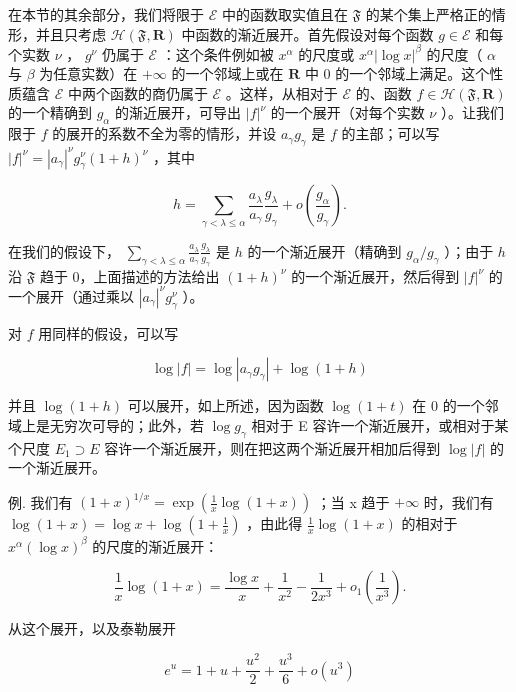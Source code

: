 在本节的其余部分，我们将限于 \(\mathcal{E}\) 中的函数取实值且在 \(\mathfrak{F}\) 的某个集上严格正的情形，并且只考虑 \(\mathcal{H}(\mathfrak{F},\mathbf{R})\) 中函数的渐近展开。首先假设对每个函数 \(g\in \mathcal{E}\) 和每个实数 \(\nu\) ， \(g^{\nu}\) 仍属于 \(\mathcal{E}\) ：这个条件例如被 \(x^{\alpha}\) 的尺度或 \(x^{\alpha}|\log x|^{\beta}\) 的尺度（ \(\alpha\) 与 \(\beta\) 为任意实数）在 \(+\infty\) 的一个邻域上或在 \(\mathbf{R}\) 中 0 的一个邻域上满足。这个性质蕴含 \(\mathcal{E}\) 中两个函数的商仍属于 \(\mathcal{E}\) 。这样，从相对于 \(\mathcal{E}\) 的、函数 \(f\in \mathcal{H}(\mathfrak{F},\mathbf{R})\) 的一个精确到 \(g_{\alpha}\) 的渐近展开，可导出 \(|f|^{\nu}\) 的一个展开（对每个实数 \(\nu\) ）。让我们限于 \(f\) 的展开的系数不全为零的情形，并设 \(a_{\gamma}g_{\gamma}\) 是 \(f\) 的主部；可以写 \(|f|^{\nu} = |a_{\gamma}|^{\nu}g_{\gamma}^{\nu}(1 + h)^{\nu}\) ，其中

\[
h = \sum_ {\gamma <   \lambda \leqslant \alpha} \frac {a _ {\lambda}}{a _ {\gamma}} \frac {g _ {\lambda}}{g _ {\gamma}} + o \left(\frac {g _ {\alpha}}{g _ {\gamma}}\right).
\]

在我们的假设下， \(\sum_{\gamma < \lambda \leqslant \alpha} \frac{a_{\lambda}}{a_{\gamma}} \frac{g_{\lambda}}{g_{\gamma}}\) 是 \(h\) 的一个渐近展开（精确到 \(g_{\alpha} / g_{\gamma}\) ）；由于 \(h\) 沿 \(\mathfrak{F}\) 趋于 0，上面描述的方法给出 \((1 + h)^{\nu}\) 的一个渐近展开，然后得到 \(|f|^{\nu}\) 的一个展开（通过乘以 \(\left|a_{\gamma}\right|^{\nu} g_{\gamma}^{\nu}\) ）。

对 \(f\) 用同样的假设，可以写

\[
\log | f | = \log \left| a _ {\gamma} g _ {\gamma} \right| + \log (1 + h)
\]

并且 \(\log(1+h)\) 可以展开，如上所述，因为函数 \(\log(1+t)\) 在 0 的一个邻域上是无穷次可导的；此外，若 \(\log g_{\gamma}\) 相对于 E 容许一个渐近展开，或相对于某个尺度 \(E_{1} \supset E\) 容许一个渐近展开，则在把这两个渐近展开相加后得到 \(\log|f|\) 的一个渐近展开。

例. 我们有 \((1+x)^{1/x}=\exp\left(\frac{1}{x}\log(1+x)\right)\) ；当 x 趋于 \(+\infty\) 时，我们有 \(\log(1+x)=\log x+\log\left(1+\frac{1}{x}\right)\) ，由此得 \(\frac{1}{x}\log(1+x)\) 的相对于 \(x^{\alpha}(\log x)^{\beta}\) 的尺度的渐近展开：

\[
\frac {1}{x} \log (1 + x) = \frac {\log x}{x} + \frac {1}{x ^ {2}} - \frac {1}{2 x ^ {3}} + o _ {1} \left(\frac {1}{x ^ {3}}\right).
\]

从这个展开，以及泰勒展开

\[
e ^ {u} = 1 + u + \frac {u ^ {2}}{2} + \frac {u ^ {3}}{6} + o (u ^ {3})
\]

